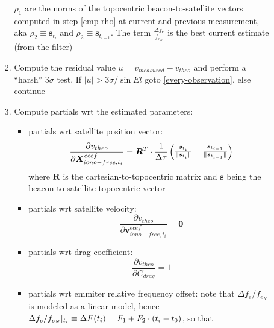 \begin{enumerate}
\begin{enumerate}
\begin{enumerate}
              $\rho _1$ are the norms of the topocentric beacon-to-satellite vectors computed in 
              step \ref{cmp-rho} at current and previous measurement, aka $\rho _2 \equiv \bm{s}_{t_i}$ 
              and $\rho _2 \equiv \bm{s}_{t_{i-1}}$. The term $\frac{\Delta f_e}{f_{e_N}}$ is the 
              best current estimate (from the filter)
            \item Compute the residual value $u = v_{measured} - v_{theo}$ and 
              perform a ``harsh'' $3\sigma$ test. If $ |u| > 3 \sigma / \sin{El}$ 
              goto \ref{every-observation}, else continue
            \item Compute partials wrt the estimated parameters:
              \begin{itemize}
                \item partials wrt satellite position vector: 
                \begin{equation} 
                  \frac{\partial v_{theo}}{\partial \bm{X}^{ecef}_{iono-free,t_i}} = 
                    \bm{R}^T \cdot \frac{1}{\Delta \tau} \begin{pmatrix} 
                      \frac{\bm{s}_{t_i}}{\lVert\bm{s}_{t_i}\rVert} - \frac{\bm{s}_{t_{i-1}}}{\lVert\bm{s}_{t_{i-1}}\rVert}
                      \end{pmatrix}
                \end{equation}
                where $\bm{R}$ is the cartesian-to-topocentric matrix and $\bm{s}$ being the 
                beacon-to-satellite topocentric vector
                \item partials wrt satellite velocity: 
                \begin{equation} 
                  \frac{\partial v_{theo}}{\partial \bm{v}^{ecef}_{iono-free,t_i}} = \bm{0}
                \end{equation}
                \item partials wrt drag coefficient:
                \begin{equation}
                  \frac{\partial v_{theo}}{\partial C_{drag}} = 1
                \end{equation}
                \item partials wrt emmiter relative frequency offset: note that 
                $\Delta f_e / f_{e_N}$ is modeled as a linear model, hence
                $\Delta f_e / f_{e_N}|_{t_i} \equiv \Delta F(t_i) = F_1 + F_2 \cdot (t_i - t_0)$, so that
                \begin{equation}
                  \begin{aligned}

\end{aligned}
\end{equation}
\end{itemize}
\end{enumerate}
\end{enumerate}
\end{enumerate}

